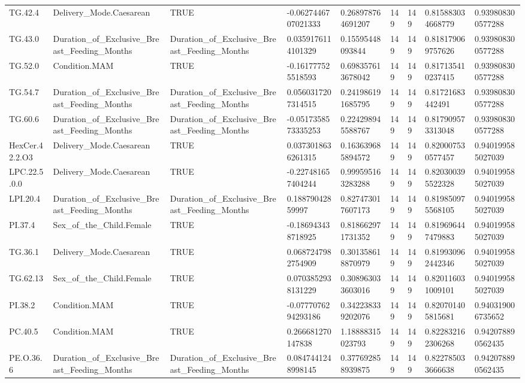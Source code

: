 \begin{longtable}{lllllllll}
TG.42.4 & Delivery\_Mode.Caesarean & TRUE & -0.0627446707021333 & 0.268978764691207 & 149 & 149 & 0.815883034668779 & 0.939808300577288 \\
TG.43.0 & Duration\_of\_Exclusive\_Breast\_Feeding\_Months & Duration\_of\_Exclusive\_Breast\_Feeding\_Months & 0.0359176114101329 & 0.15595448093844 & 149 & 149 & 0.818179069757626 & 0.939808300577288 \\
TG.52.0 & Condition.MAM & TRUE & -0.161777525518593 & 0.698357613678042 & 149 & 149 & 0.817135410237415 & 0.939808300577288 \\
TG.54.7 & Duration\_of\_Exclusive\_Breast\_Feeding\_Months & Duration\_of\_Exclusive\_Breast\_Feeding\_Months & 0.0560317207314515 & 0.241986191685795 & 149 & 149 & 0.81721683442491 & 0.939808300577288 \\
TG.60.6 & Duration\_of\_Exclusive\_Breast\_Feeding\_Months & Duration\_of\_Exclusive\_Breast\_Feeding\_Months & -0.0517358573335253 & 0.224298945588767 & 149 & 149 & 0.817909573313048 & 0.939808300577288 \\
HexCer.42.2.O3 & Delivery\_Mode.Caesarean & TRUE & 0.0373018636261315 & 0.163639685894572 & 149 & 149 & 0.820007530577457 & 0.940199585027039 \\
LPC.22.5.0.0 & Delivery\_Mode.Caesarean & TRUE & -0.227481657404244 & 0.999595163283288 & 149 & 149 & 0.820300395522328 & 0.940199585027039 \\
LPI.20.4 & Duration\_of\_Exclusive\_Breast\_Feeding\_Months & Duration\_of\_Exclusive\_Breast\_Feeding\_Months & 0.18879042859997 & 0.827473017607173 & 149 & 149 & 0.819850975568105 & 0.940199585027039 \\
PI.37.4 & Sex\_of\_the\_Child.Female & TRUE & -0.186943438718925 & 0.818662971731352 & 149 & 149 & 0.819696447479883 & 0.940199585027039 \\
TG.36.1 & Delivery\_Mode.Caesarean & TRUE & 0.0687247982754909 & 0.301358618870979 & 149 & 149 & 0.819930962442346 & 0.940199585027039 \\
TG.62.13 & Sex\_of\_the\_Child.Female & TRUE & 0.0703852938131229 & 0.308963033603016 & 149 & 149 & 0.820116031009101 & 0.940199585027039 \\
PI.38.2 & Condition.MAM & TRUE & -0.0777076294293186 & 0.342238339202076 & 149 & 149 & 0.820701405815681 & 0.940319006735652 \\
PC.40.5 & Condition.MAM & TRUE & 0.266681270147838 & 1.18888315023793 & 149 & 149 & 0.822832162306268 & 0.942078890562435 \\
PE.O.36.6 & Duration\_of\_Exclusive\_Breast\_Feeding\_Months & Duration\_of\_Exclusive\_Breast\_Feeding\_Months & 0.0847441248998145 & 0.377692858939875 & 149 & 149 & 0.822785033666638 & 0.942078890562435 \\

\end{longtable}
